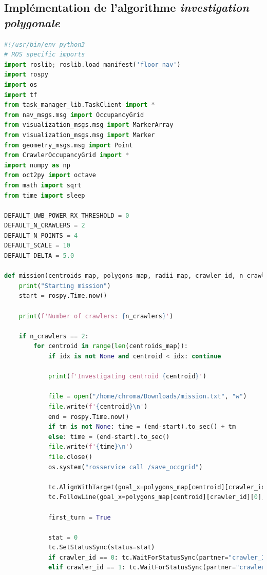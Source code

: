 \documentclass[francais,RandD]{rapportPFE}
\begin{document}
		\subsection{Implémentation de l'algorithme \textit{investigation polygonale}}
			\begin{lstlisting}[language=Python,caption={Implémentation de l'algorithme d'investigation polygonale},label=lst:investigation_polygonale]
#!/usr/bin/env python3
# ROS specific imports
import roslib; roslib.load_manifest('floor_nav')
import rospy
import os
import tf
from task_manager_lib.TaskClient import *
from nav_msgs.msg import OccupancyGrid
from visualization_msgs.msg import MarkerArray
from visualization_msgs.msg import Marker
from geometry_msgs.msg import Point
from CrawlerOccupancyGrid import *
import numpy as np
from oct2py import octave
from math import sqrt
from time import sleep

DEFAULT_UWB_POWER_RX_THRESHOLD = 0
DEFAULT_N_CRAWLERS = 2
DEFAULT_N_POINTS = 4
DEFAULT_SCALE = 10
DEFAULT_DELTA = 5.0

def mission(centroids_map, polygons_map, radii_map, crawler_id, n_crawlers, n_points, cruise_velocity, investigation_velocity, idx=None, tm=None):
	print("Starting mission")
	start = rospy.Time.now()

	print(f'Number of crawlers: {n_crawlers}')

	if n_crawlers == 2:
		for centroid in range(len(centroids_map)):
			if idx is not None and centroid < idx: continue

			print(f'Investigating centroid {centroid}')

			file = open("/home/chroma/Downloads/mission.txt", "w")
			file.write(f'{centroid}\n')
			end = rospy.Time.now()
			if tm is not None: time = (end-start).to_sec() + tm
			else: time = (end-start).to_sec()
			file.write(f'{time}\n')
			file.close()
			os.system("rosservice call /save_occgrid")

			tc.AlignWithTarget(goal_x=polygons_map[centroid][crawler_id][0], goal_y=polygons_map[centroid][crawler_id][1], angle_threshold=0.05)
			tc.FollowLine(goal_x=polygons_map[centroid][crawler_id][0], goal_y=polygons_map[centroid][crawler_id][1], max_velocity=cruise_velocity)

			first_turn = True

			stat = 0
			tc.SetStatusSync(status=stat)
			if crawler_id == 0: tc.WaitForStatusSync(partner="crawler_1", status=stat)
			elif crawler_id == 1: tc.WaitForStatusSync(partner="crawler_0", status=stat)


\end{lstlisting}
\end{document}
